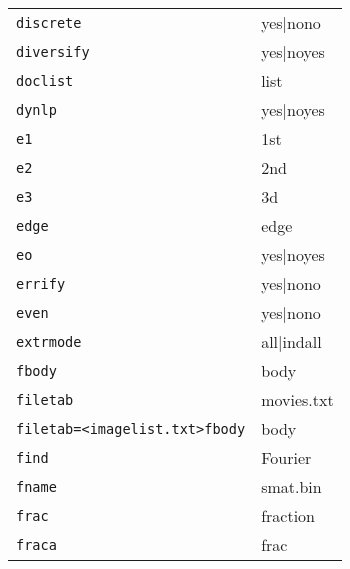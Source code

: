 \begin{tabular}{ll}
\texttt{discrete}&{yes|no{no}}\\
\texttt{diversify}&{yes|no{yes}}\\
\texttt{doclist}&{list}\\
\texttt{dynlp}&{yes|no{yes}}\\
\texttt{e1}&{1st}\\
\texttt{e2}&{2nd}\\
\texttt{e3}&{3d}\\
\texttt{edge}&{edge}\\
\texttt{eo}&{yes|no{yes}}\\
\texttt{errify}&{yes|no{no}}\\
\texttt{even}&{yes|no{no}}\\
\texttt{extrmode}&{all|ind{all}}\\
\texttt{fbody}&{body}\\
\texttt{filetab}&{movies.txt}\\
\texttt{filetab=<imagelist.txt>fbody}&{body}\\
\texttt{find}&{Fourier}\\
\texttt{fname}&{smat.bin}\\
\texttt{frac}&{fraction}\\
\texttt{fraca}&{frac}\\
\end{tabular}

